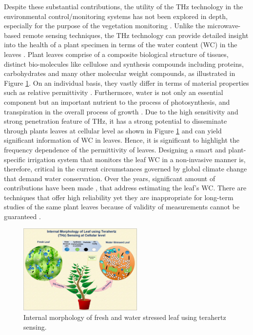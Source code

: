 \documentclass[preprints,article,accept,moreauthors,pdftex]{Definitions/mdpi}
\renewcommand{\^}{\hat}  %
\begin{document}
Despite these substantial contributions, the utility of the THz technology in the environmental control/monitoring systems has not been explored in depth, especially for the purpose of the vegetation monitoring \cite{Zahid2018,Davy2017}. Unlike the microwave-based remote sensing techniques, the THz technology can provide detailed insight into the health of a plant specimen in terms of the water content (WC) in the leaves \cite{Santesteban2015}. {Plant leaves comprise of a composite biological structure of tissues, distinct bio-molecules like cellulose and synthesis compounds including proteins, carbohydrates and many other molecular weight compounds, as illustrated in Figure }\ref{fig:TerahertzSensing1}.{ On an individual basis, they vastly differ in terms of material properties such as relative permittivity \cite{Gente}}. {Furthermore, water is not only an essential component but an important nutrient to the process of photosynthesis, and transpiration in the overall process of growth \cite{Torres2016}. Due to the high sensitivity and strong penetration feature of THz, it has a strong potential to disseminate through plants leaves at cellular level as shown in Figure }\ref{fig:TerahertzSensing1} {and can yield significant information of WC in leaves. Hence, it is significant to highlight the frequency dependence of the permittivity of leaves}. Designing a smart and plant-specific irrigation system that monitors the leaf WC in a non-invasive manner is, therefore, critical in the current circumstances governed by global climate change that demand water conservation. Over the years, significant amount of contributions have been made \cite{Davy2017,Torres2016,Santesteban2015,Jordens2009,Gente}, that address estimating the leaf's WC. There are techniques that offer high reliability yet they are inappropriate for long-term studies of the same plant leaves because of validity of measurements cannot be guaranteed \cite{Gente,Gente2015,Born2014,Breitenstein2011,Nie2017}.

\begin{figure}[t!]
	\centering
	\includegraphics[width=0.55\textwidth]{TerahertzSensing5R.jpg}
	\caption{{Internal morphology of fresh and water stressed leaf using terahertz sensing.}}
	\label{fig:TerahertzSensing1}
\end{figure}
\end{document}
